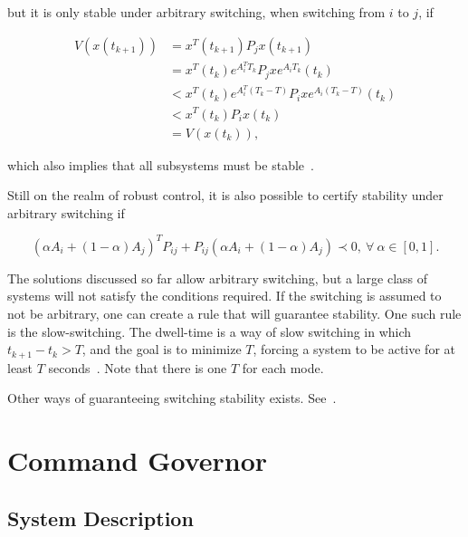 but it is only stable under arbitrary switching, when switching from
\(i\) to \(j\), if

\begin{align}
	V(x(t_{k+1})) & = x^{T}(t_{k+1})P_{j}x(t_{k+1})                                     \\
	              & = x^{T}(t_{k})e^{A^{T}_{i}T_{k}}P_{j}xe^{A_{i}T_{k}}(t_{k})         \\
	              & < x^{T}(t_{k})e^{A^{T}_{i}(T_{k}-T)}P_{i}xe^{A_{i}(T_{k}-T)}(t_{k}) \\
	              & < x^{T}(t_{k})P_{i}x(t_{k})                                         \\
	              & = V(x(t_{k})),
\end{align}

which also implies that all subsystems must be
stable~\parencite{geromel.colaneri:stabilization}.

Still on the realm of robust control, it is also possible to certify stability
under arbitrary switching if~\parencite{liberzon.morse:basic}

\begin{equation}
	(\alpha{}A_{i}+(1-\alpha)A_{j})^{T}P_{ij}+P_{ij}(\alpha{}A_{i}+(1-\alpha)A_{j}) \prec{} 0,~\forall{}~\alpha{}\in{}[0,1].
\end{equation}

The solutions discussed so far allow arbitrary switching, but a large class of
systems will not satisfy the conditions required. If the switching is assumed to
not be arbitrary, one can create a rule that will guarantee stability. One such
rule is the slow-switching. The dwell-time is a way of slow switching in which
\(t_{k+1}-t_{k}>T\), and the goal is to minimize \(T\), forcing a system to be
active for at least \(T\)
seconds~\parencite{chesi.colaneri.ea:computing,franzè.lucia.ea:command,liberzon.morse:basic}.
Note that there is one \(T\) for each mode.

Other ways of guaranteeing switching stability exists.
See~\textcite{geromel.deaecto:stability,liberzon.morse:basic,geromel.colaneri:stabilization}.

\section{Command Governor}%
\label{sec:command-governor}

\subsection{System Description}%
\label{subsec:system-description}


